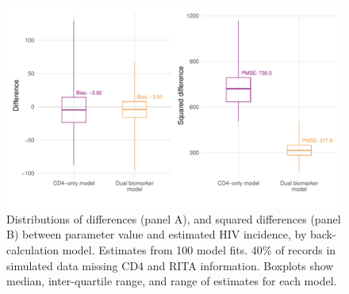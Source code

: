 \begin{figure}
  \centering
  \includegraphics[width=\textwidth]{incidence_mse_miss.pdf}
  \caption[Distributions of differences and squared differences between parameter value and estimated HIV incidence, by back-calculation model]{Distributions of differences (panel A), and squared differences (panel B) between parameter value and estimated HIV incidence, by back-calculation model. Estimates from 100 model fits. 40\% of records in simulated data missing CD4 and RITA information. Boxplots show median, inter-quartile range, and range of estimates for each model.}\label{fig:boxplot_miss}
\end{figure}

